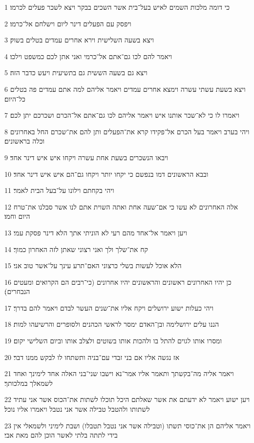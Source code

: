 \par 1 כי דומה מלכות השמים לאיש בעל־בית אשר השכים בבקר ויצא לשכר פעלים לכרמו׃
\par 2 ויפסק עם הפעלים דינר ליום וישלחם אל־כרמו׃
\par 3 ויצא בשעה השלישית וירא אחרים עמדים בטלים בשוק׃
\par 4 ויאמר להם לכו גם־אתם אל־כרמי ואני אתן לכם כמשפט וילכו׃
\par 5 ויצא גם בשעה הששית גם בתשיעית ויעש כדבר הזה׃
\par 6 ויצא בשעת עשתי עשרה וימצא אחרים עמדים ויאמר אליהם למה אתם עמדים פה בטלים כל־היום׃
\par 7 ויאמרו לו כי לא־שכר אותנו איש ויאמר אליהם לכו גם־אתם אל־הכרם ושכרכם יתן לכם׃
\par 8 ויהי בערב ויאמר בעל הכרם אל־פקידו קרא את־הפעלים ותן להם את־שכרם החל באחרונים וכלה בראשונים׃
\par 9 ויבאו הנשכרים בשעת אחת עשרה ויקחו איש איש דינר אחד׃
\par 10 ובבא הראשונים דמו בנפשם כי יקחו יותר ויקחו גם־הם איש איש דינר אחד׃
\par 11 ויהי בקחתם וילונו על־בעל הבית לאמר׃
\par 12 אלה האחרונים לא עשו כי אם־שעה אחת ואתה השוית אתם לנו אשר סבלנו את־טרח היום וחמו׃
\par 13 ויען ויאמר אל־אחד מהם רעי לא הוניתי אתך הלא דינר פסקת עמי׃
\par 14 קח את־שלך ולך ואני רצוני שאתן לזה האחרון כמוך׃
\par 15 הלא אוכל לעשות בשלי כרצוני האם־תרע עינך על־אשר טוב אני׃
\par 16 כן יהיו האחרונים ראשונים והראשונים יהיו אחרונים (כי־רבים הם הקרואים ומעטים הנבחרים)׃
\par 17 ויהי כעלות ישוע ירושלים ויקח אליו את־שנים העשר לבדם ויאמר להם בדרך׃
\par 18 הננו עלים ירושלימה ובן־האדם ימסר לראשי הכהנים ולסופרים והרשיעהו למות׃
\par 19 ומסרו אותו לגוים להתל בו ולהכות אותו בשוטים ולצלב אותו וביום השלישי יקום׃
\par 20 אז נגשה אליו אם בני זבדי עם־בניה ותשתחו לו לבקש ממנו דבר׃
\par 21 ויאמר אליה מה־בקשתך ותאמר אליו אמר־נא וישבו שני־בני האלה אחד לימינך ואחד לשמאלך במלכותך׃
\par 22 ויען ישוע ויאמר לא ידעתם את אשר שאלתם היכל תוכלו לשתות את־הכוס אשר אני עתיד לשתותו ולהטבל טבילה אשר אני נטבל ויאמרו אליו נוכל׃
\par 23 ויאמר אליהם הן את־כוסי תשתו (וטבילה אשר אני נטבל תטבלו) ושבת לימיני ולשמאלי אין בידי לתתה בלתי לאשר הוכן להם מאת אבי׃
